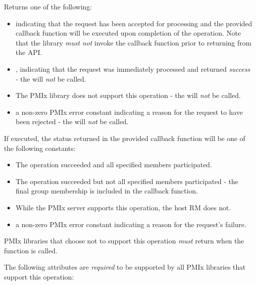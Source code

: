 Returns one of the following:

\begin{itemize}
\item {} indicating that the request has been accepted for processing and the provided callback function will be executed upon completion of the operation. Note that the library \emph{must not} invoke the callback function prior to returning from the \ac{API}.
\item {}, indicating that the request was immediately processed and returned \textit{success} - the  will \textit{not} be called.
\item {} The \ac{PMIx} library does not support this operation - the  will \textit{not} be called.
\item a non-zero \ac{PMIx} error constant indicating a reason for the request to have been rejected - the  will \textit{not} be called.
\end{itemize}

If executed, the status returned in the provided callback function will be one of the following constants:

\begin{itemize}
\item {} The operation succeeded and all specified members participated.
\item {} The operation succeeded but not all specified members participated - the final group membership is included in the callback function.
\item {} While the \ac{PMIx} server supports this operation, the host \ac{RM} does not.
\item a non-zero \ac{PMIx} error constant indicating a reason for the request's failure.
\end{itemize}

\reqattrstart
\ac{PMIx} libraries that choose not to support this operation \textit{must} return  when the function is called.

The following attributes are \textit{required} to be supported by all \ac{PMIx} libraries that support this operation:


